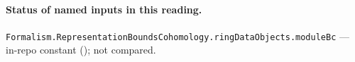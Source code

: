 

\paragraph{Status of named inputs in this reading.}
\noindent\nolinkurl{Formalism.RepresentationBoundsCohomology.ringDataObjects.moduleBc} --- in-repo constant (); not compared.\par

